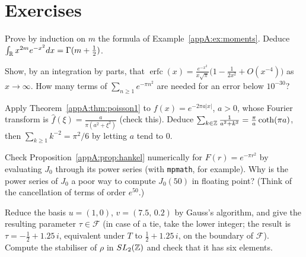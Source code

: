 \section{Exercises}\label{appA:sec:exos}

\begin{exercise}\label{appA:exo:moments}
Prove by induction on $m$ the formula of Example~\ref{appA:ex:moments}. Deduce
$\int_{\mathbb{R}} x^{2m}e^{-x^2}dx=\Gamma(m+\tfrac12)$.
\end{exercise}

\begin{exercise}\label{appA:ex:erfc}
Show, by an integration by parts, that $\operatorname{erfc}(x)=\frac{e^{-x^2}}{x\sqrt\pi}\bigl(1-\frac1{2x^2}
+O(x^{-4})\bigr)$ as $x\to\infty$. How many terms of $\sum_{n\ge1}e^{-\pi n^2}$ are needed for an error below
$10^{-30}$?
\end{exercise}

\begin{exercise}
Apply Theorem~\ref{appA:thm:poisson1} to $f(x)=e^{-2\pi a|x|}$, $a>0$, whose Fourier transform is
$\hat f(\xi)=\frac{a}{\pi(a^2+\xi^2)}$ (check this). Deduce $\sum_{k\in\mathbb{Z}}\frac1{a^2+k^2}=\frac\pi a\coth(\pi a)$,
then $\sum_{k\ge1}k^{-2}=\pi^2/6$ by letting $a$ tend to $0$.
\end{exercise}

\begin{exercise}
Check Proposition~\ref{appA:prop:hankel} numerically for $F(r)=e^{-\pi r^2}$ by evaluating $J_0$ through its power
series (with \texttt{mpmath}, for example). Why is the power series of $J_0$ a poor way to compute
$J_0(50)$ in floating point? (Think of the cancellation of terms of order $e^{50}$.)
\end{exercise}

\begin{exercise}
Reduce the basis $u=(1,0)$, $v=(7.5,\,0.2)$ by Gauss's algorithm, and give the resulting parameter $\tau\in\mathcal F$ (in case of a tie, take the lower integer; the result is $\tau=-\tfrac12+1.25\,i$, equivalent under $T$ to $\tfrac12+1.25\,i$, on the boundary of $\mathcal F$).
Compute the stabiliser of $\rho$ in $SL_2(\mathbb{Z})$ and check that it has six elements.
\end{exercise}
